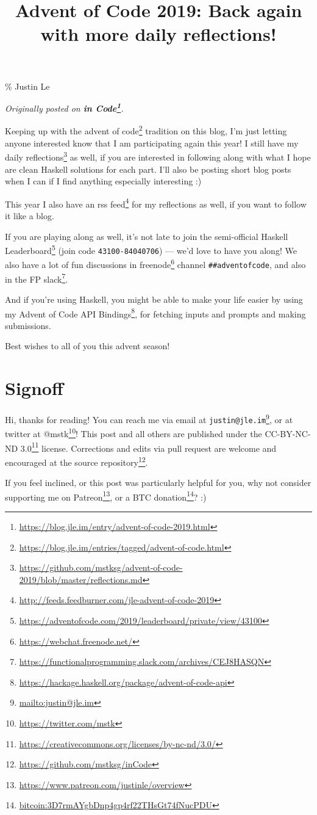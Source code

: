 \documentclass[]{article}
\title{Advent of Code 2019: Back again with more daily reflections!}
\renewcommand{\href}[2]{#2\footnote{\url{#1}}}
\begin{document}
\maketitle

\% Justin Le

\emph{Originally posted on
\textbf{\href{https://blog.jle.im/entry/advent-of-code-2019.html}{in Code}}.}

Keeping up with the
\href{https://blog.jle.im/entries/tagged/advent-of-code.html}{advent of code}
tradition on this blog, I'm just letting anyone interested know that I am
participating again this year! I still have my
\href{https://github.com/mstksg/advent-of-code-2019/blob/master/reflections.md}{daily
reflections} as well, if you are interested in following along with what I hope
are clean Haskell solutions for each part. I'll also be posting short blog posts
when I can if I find anything especially interesting :)

This year I also have an
\href{http://feeds.feedburner.com/jle-advent-of-code-2019}{rss feed} for my
reflections as well, if you want to follow it like a blog.

If you are playing along as well, it's not late to join the semi-official
\href{https://adventofcode.com/2019/leaderboard/private/view/43100}{Haskell
Leaderboard} (join code \texttt{43100-84040706}) --- we'd love to have you
along! We also have a lot of fun discussions in
\href{https://webchat.freenode.net/}{freenode} channel
\texttt{\#\#adventofcode}, and also in the
\href{https://functionalprogramming.slack.com/archives/CEJ8HASQN}{FP slack}.

And if you're using Haskell, you might be able to make your life easier by using
my \href{https://hackage.haskell.org/package/advent-of-code-api}{Advent of Code
API Bindings}, for fetching inputs and prompts and making submissions.

Best wishes to all of you this advent season!

\section{Signoff}\label{signoff}

Hi, thanks for reading! You can reach me via email at
\href{mailto:justin@jle.im}{\nolinkurl{justin@jle.im}}, or at twitter at
\href{https://twitter.com/mstk}{@mstk}! This post and all others are published
under the \href{https://creativecommons.org/licenses/by-nc-nd/3.0/}{CC-BY-NC-ND
3.0} license. Corrections and edits via pull request are welcome and encouraged
at \href{https://github.com/mstksg/inCode}{the source repository}.

If you feel inclined, or this post was particularly helpful for you, why not
consider \href{https://www.patreon.com/justinle/overview}{supporting me on
Patreon}, or a \href{bitcoin:3D7rmAYgbDnp4gp4rf22THsGt74fNucPDU}{BTC donation}?
:)
\end{document}
